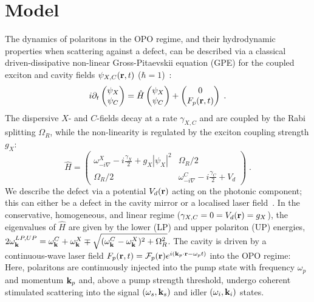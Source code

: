 \section{Model}
%
The dynamics of polaritons in the OPO regime, and their hydrodynamic
properties when scattering against a defect, can be described via a
classical driven-dissipative non-linear Gross-Pitaevskii equation
(GPE) for the coupled exciton and cavity fields $\psi_{X,C}
({\mathbf r},t)$ ($\hbar=1$)~\cite{Whittaker_2005,Carusotto_2013}:
%
\begin{equation}
  i\partial_t \begin{pmatrix} \psi_X \\ \psi_C \end{pmatrix} =
  \hat{H} \begin{pmatrix} \psi_X \\ \psi_C \end{pmatrix}
  + \begin{pmatrix} 0 \\ F_p({\mathbf r},t) \end{pmatrix} \; .
\label{eq:gpequ}
\end{equation}
%
The dispersive $X$- and $C$-fields decay at a rate $\gamma_{X,C}$ and
are coupled by the Rabi splitting $\Omega_R$, while the non-linearity
is regulated by the exciton coupling strength $g_X$:
%
\begin{equation}
  \hat{H} = \begin{pmatrix} \omega^{X}_{-i\nabla} - i
    \frac{\gamma_X}{2} + g_X |\psi_X|^2 & \Omega_R/2 \\ \Omega_R/2 &
    \omega^C_{-i\nabla} - i \frac{\gamma_C}{2} + V_d \end{pmatrix} \;
  .
\end{equation}
%
We describe the defect via a potential $V_d ({\mathbf r})$ acting on the
photonic component; this can either be a defect in the cavity mirror
or a localised laser field~\cite{Amo_2009,Amo_2010,Zajac_2012}.
%
In the conservative, homogeneous, and linear regime ($\gamma_{X,C}=0=
V_d ({\mathbf r})= g_X$), the eigenvalues of $\hat{H}$ are given by the
lower (LP) and upper polariton (UP) energies, $2
\omega_{{\mathbf k}}^{LP,UP} = \omega_{{\mathbf k}}^{C} +
\omega_{{\mathbf k}}^{X} \mp \sqrt{(\omega_{{\mathbf k}}^{C} -
  \omega_{{\mathbf k}}^{X})^2 + \Omega_R^2}$.
%
The cavity is driven by a continuous-wave laser field $F_p({\mathbf r},t)
= \mathcal{F}_p({\mathbf r}) e^{i ({\mathbf k}_p \cdot {\mathbf r} - \omega_p
  t)}$ into the OPO regime: Here, polaritons are continuously injected
into the pump state with frequency $\omega_p$ and momentum
${\mathbf k}_p$ and, above a pump strength threshold, undergo coherent
stimulated scattering into the signal $(\omega_s, {\mathbf k}_s)$ and
idler $(\omega_i, {\mathbf k}_i)$ states. 


